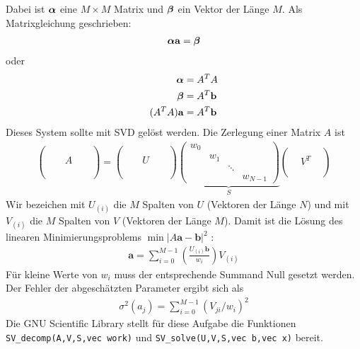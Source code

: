 \documentclass{article}
\newcommand{\vect}[1]{\mathbf{#1}}
\renewcommand{\a}{\vect a}
\newcommand{\valpha}{\mbox{\boldmath{$\alpha$}}}
\newcommand{\vbeta}{\mbox{\boldmath{$\beta$}}}
\def\a{\vect a}
\def\b{\vect b}
\def\({\left(}
\def\){\right)}
\begin{document}
Dabei ist $\valpha$ eine $M\times M$ Matrix und $\vbeta$ ein Vektor
der L\"ange $M$. Als Matrixgleichung geschrieben:
\begin{align}
  \valpha \a = \vbeta
\end{align}
oder
\begin{align}
  \valpha &= A^T A\\
  \vbeta &= A^T \b\\
  (A^T A) \a &= A^T \b
\end{align}
Dieses System sollte mit SVD gel\"ost werden. Die Zerlegung einer Matrix $A$ ist 
\begin{align}
  \begin{pmatrix}
  &&&&\\
  &&&&\\ 
  &&A&&\\
  &&&&\\
  &&&&\\ 
  \end{pmatrix}
  =
  \begin{pmatrix}
  &&&&\\
  &&&&\\ 
  &&U&&\\
  &&&&\\
  &&&&\\
  \end{pmatrix}
  \underbrace{
  \begin{pmatrix}
  w_0 \\
  {} & w_1 \\
  {} & {} & \ddots \\
  {} & {} & {} & w_{N-1}
  \end{pmatrix}}_S
  \begin{pmatrix}
  &&\\ 
  & V^T &\\
  &&\\
  \end{pmatrix}
\end{align}
Wir bezeichen mit $U_{(i)}$ die $M$ Spalten von $U$ (Vektoren der
L\"ange $N$) und mit $V_{(i)}$ die $M$ Spalten von $V$ (Vektoren der
L\"ange $M$). Damit ist die L\"osung des linearen
Minimierungsproblems $\min |A\a-\b|^2$ :
\begin{align}
  \a = \sum_{i=0}^{M-1} \(\frac{U_{(i)}\b}{w_i}\)  V_{(i)}
\end{align}
F\"ur kleine Werte von $w_i$ muss der entsprechende Summand Null
gesetzt werden.  Der Fehler der abgesch\"atzten Parameter ergibt sich
als
\begin{align}
  \sigma^2(a_j) = \sum_{i=0}^{M-1} \(V_{ji}/w_i\)^2
\end{align}
Die GNU Scientific Library stellt f\"ur diese Aufgabe die Funktionen \verb!SV_decomp(A,V,S,vec work)! und  \verb!SV_solve(U,V,S,vec b,vec x)! bereit.
\end{document}
